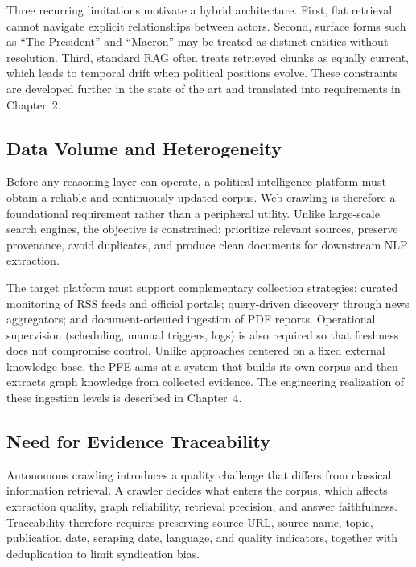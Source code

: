 Three recurring limitations motivate a hybrid architecture. First, flat retrieval cannot navigate explicit relationships between actors. Second, surface forms such as ``The President'' and ``Macron'' may be treated as distinct entities without resolution. Third, standard RAG often treats retrieved chunks as equally current, which leads to temporal drift when political positions evolve. These constraints are developed further in the state of the art and translated into requirements in Chapter~2.

\subsection{Data Volume and Heterogeneity}

Before any reasoning layer can operate, a political intelligence platform must obtain a reliable and continuously updated corpus. Web crawling is therefore a foundational requirement rather than a peripheral utility. Unlike large-scale search engines, the objective is constrained: prioritize relevant sources, preserve provenance, avoid duplicates, and produce clean documents for downstream NLP extraction.

The target platform must support complementary collection strategies: curated monitoring of RSS feeds and official portals; query-driven discovery through news aggregators; and document-oriented ingestion of PDF reports. Operational supervision (scheduling, manual triggers, logs) is also required so that freshness does not compromise control. Unlike approaches centered on a fixed external knowledge base, the PFE aims at a system that builds its own corpus and then extracts graph knowledge from collected evidence. The engineering realization of these ingestion levels is described in Chapter~4.

\subsection{Need for Evidence Traceability}

Autonomous crawling introduces a quality challenge that differs from classical information retrieval. A crawler decides what enters the corpus, which affects extraction quality, graph reliability, retrieval precision, and answer faithfulness. Traceability therefore requires preserving source URL, source name, topic, publication date, scraping date, language, and quality indicators, together with deduplication to limit syndication bias.

